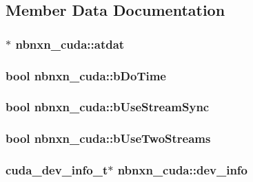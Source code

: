 \subsection{\-Member \-Data \-Documentation}
\hypertarget{structnbnxn__cuda_a629906b31cd6213ce521da39e272ae31}{
\subsubsection[{atdat}]{$\ast$ {\bf nbnxn\-\_\-cuda\-::atdat}}}\label{structnbnxn__cuda_a629906b31cd6213ce521da39e272ae31}
\hypertarget{structnbnxn__cuda_a559b44129362ae836979291d41e36d8b}{
\subsubsection[{b\-Do\-Time}]{\setlength{\rightskip}{0pt plus 5cm}bool {\bf nbnxn\-\_\-cuda\-::b\-Do\-Time}}}\label{structnbnxn__cuda_a559b44129362ae836979291d41e36d8b}
\hypertarget{structnbnxn__cuda_a2fb78d73b3eb4f11e94ef0fe9796ac84}{
\subsubsection[{b\-Use\-Stream\-Sync}]{\setlength{\rightskip}{0pt plus 5cm}bool {\bf nbnxn\-\_\-cuda\-::b\-Use\-Stream\-Sync}}}\label{structnbnxn__cuda_a2fb78d73b3eb4f11e94ef0fe9796ac84}
\hypertarget{structnbnxn__cuda_ae3882ccf40b3b603188e85b4d2290c97}{
\subsubsection[{b\-Use\-Two\-Streams}]{\setlength{\rightskip}{0pt plus 5cm}bool {\bf nbnxn\-\_\-cuda\-::b\-Use\-Two\-Streams}}}\label{structnbnxn__cuda_ae3882ccf40b3b603188e85b4d2290c97}
\hypertarget{structnbnxn__cuda_a42292fb3ba240db4470f7918f1c81007}{
\subsubsection[{dev\-\_\-info}]{\setlength{\rightskip}{0pt plus 5cm}cuda\-\_\-dev\-\_\-info\-\_\-t$\ast$ {\bf nbnxn\-\_\-cuda\-::dev\-\_\-info}}}\label{structnbnxn__cuda_a42292fb3ba240db4470f7918f1c81007}
